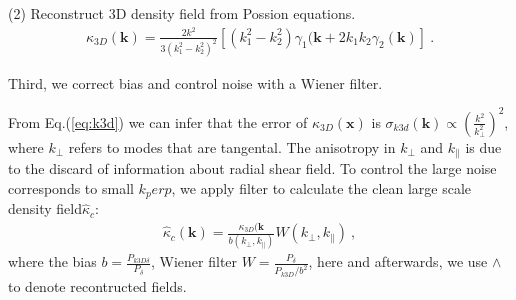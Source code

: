 (2) Reconstruct 3D density field from Possion equations.
\begin{eqnarray}
\label{eq:k3d}
\kappa_{3D}(\bm{k})=\frac{2k^2}{3(k_1^2-k_2^2)^2}[(k_1^2-k_2^2)\gamma_1(\bm{k}+2k_1k_2\gamma_2(\bm{k})]\ .
\end{eqnarray}

Third, we correct bias and control noise with a Wiener filter.

From Eq.(\ref{eq:k3d}) we can infer that the error of $\kappa_{3D}(\bm{x})$ is 
$\sigma_{k3d}(\bm{k})\propto(\frac{k^2}{k_\perp^2})^2$, where $k_\perp$ refers to modes that are tangental.
The anisotropy in $k_\perp$ and $k_\parallel$ is due to the discard of information about radial shear field.
To control the large noise corresponds to small $k_perp$, we apply filter to calculate the clean large scale density field$\hat \kappa_c$:
\begin{eqnarray}
	\label{eq:wiener}
\hat \kappa_{c}(\bm{k})=\frac{\kappa_{3D}(\bm{k}}{b(k_\perp,k_\parallel)}W(k_\perp,k_\parallel)\ ,
\end{eqnarray}
where the bias $b=\frac{P_{k3D \delta}}{P_\delta}$, Wiener filter $W=\frac{P_\delta}{P_{k3D}/b^2}$, here and afterwards, 
we use $\wedge$ to denote recontructed fields.

